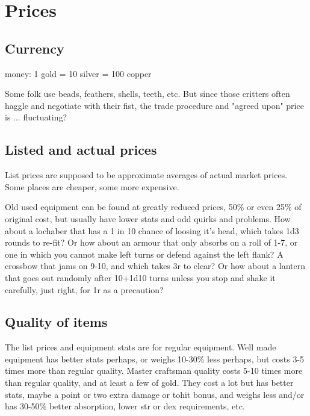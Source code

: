 



\cleardoublepage

\chapter*{Prices}





\section*{Currency}
money: 1 gold = 10 silver = 100 copper

Some folk use beads, feathers, shells, teeth, etc. But since those critters often haggle and negotiate with their fist, the trade procedure and "agreed upon" price is ... fluctuating?




\section*{Listed and actual prices}
List prices are supposed to be approximate averages of actual market prices. Some places are cheaper, some more expensive.

Old used equipment can be found at greatly reduced prices, 50\% or even 25\% of original cost, but usually have lower stats and odd quirks and problems. How about a lochaber that has a 1 in 10 chance of loosing it's head, which takes 1d3 rounds to re-fit? Or how about an armour that only absorbs on a roll of 1-7, or one in which you cannot make left turns or defend against the left flank? A crossbow that jams on 9-10, and which takes 3r to clear? Or how about a lantern that goes out randomly after 10+1d10 turns unless you stop and shake it carefully, just right, for 1r as a precaution?


\section*{Quality of items}
The list prices and equipment stats are for regular equipment. Well made equipment has better stats perhaps, or weighs 10-30\% less perhaps, but costs 3-5 times more than regular quality. Master craftsman quality costs 5-10 times more than regular quality, and at least a few of gold. They cost a lot but has better stats, maybe a point or two extra damage or tohit bonus, and weighs less and/or has 30-50\% better absorption, lower str or dex requirements, etc.

